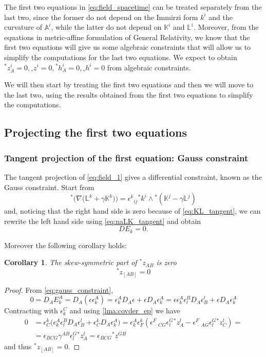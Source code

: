 \documentclass[a4paper, 11pt]{article}
\def\A{\mathbb{A}}
\def\L{\mathbb{L}}
\def\K{\mathbb{K}}
\def\ga{\gamma}
\def\ep{\epsilon}
\def\na{\nabla}
\newtheorem{corollary}[equation]{Corollary}
\def\we{\wedge}
\def\tp#1{{}^\ast\!#1}
\def\np#1{{}_\circ#1}
\numberwithin{equation}{section}
\begin{document}
The first two equations in \eqref{eq:field_spacetime} can be treated separately from the last two, since the former do not depend on the Immirzi form $k^i$ and the curvature of $\A^i$, while the latter do not depend on $\K^i$ and $\L^i$. Moreover, from the equations in metric-affine formulation of General Relativity, we know that the first two equations will give us some algebraic constraints that will allow us to simplify the computations for the last two equations. We expect to obtain $\tp z^i_A = 0, \np z^i = 0, \tp h^i_A = 0, \np h^i = 0$ from algebraic constraints.

We will then start by treating the first two equations and then we will move to the last two, using the results obtained from the first two equations to simplify the computations.

\subsection{Projecting the first two equations}

\subsubsection{Tangent projection of the first equation: Gauss constraint}

The tangent projection of \eqref{eq:field_1} gives a differential constraint, known as the Gauss constraint. Start from 
\begin{equation*}
   \tp\Big(\na\big(\L^k + \ga \K^k\big)\Big) = \ep^k{}_{ij} \tp k^i \we \tp\left(\K^j - \ga \L^j\right)
\end{equation*}
and, noticing that the right hand side is zero because of \eqref{eq:KL_tangent}, we can rewrite the left hand side using  \eqref{eq:naLK_tangent} and obtain
\begin{equation}
    \boxed{D E_k = 0}  \label{eq:gauss_constraint}.
\end{equation}

Moreover the following corollary holds:
\begin{corollary}
    \label{cor:skew_z}
    The skew-symmetric part of $\tp z_{AB}$ is zero
    \[
        \tp z_{[AB]} = 0
    \]
\end{corollary}
\begin{proof}
From \eqref{eq:gauss_constraint},
\[
    0 = D_A E^A_k =  D_A\left(\ep \ep^A_k\right) = \ep^A_k D_A\ep + \ep D_A\ep^A_k = \ep \ep^A_k  \ep^B_l D_A \ep^l_B + \ep D_A \ep^A_k 
\]
Contracting with $\ep^C_k$ and using  \ref{lma:covder_ep} we have
\begin{align*}
    0 &= \ep^k_C \Big( \ep^A_k \ep^B_l D_A \ep^l_B + \ep^k_C D_A \ep^A_k\Big) = \ep^A_k  \ep^k_F  \left(\ep^F_{\> \cdot  \> CG}\ep^G_l \tp z^l_A - \ep^F_{\> \cdot  \> AG} \ep^G_l \tp z^l_C\right) =  \\ 
&= \ep_{BCG} \gamma^{AB} \ep^G_l\tp z^l_A = \ep_{BCG} \tp z^{GB}
\end{align*}
and thus $\tp z_{[AB]} = 0$.

\end{proof}
\end{document}
